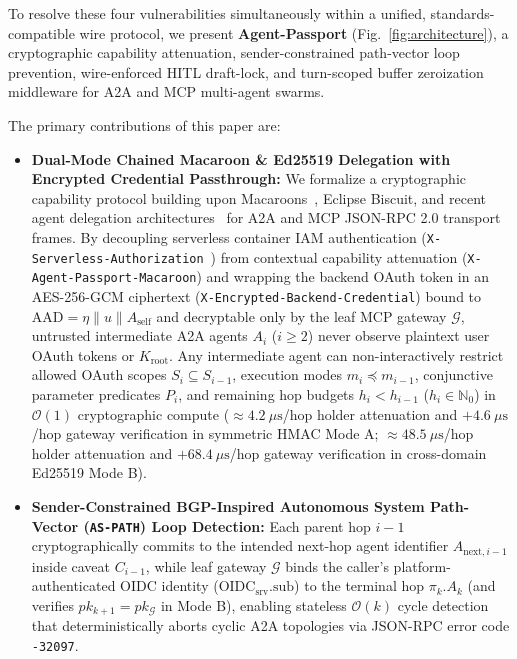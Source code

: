 \documentclass[conference,10pt]{IEEEtran}
\begin{document}
To resolve these four vulnerabilities simultaneously within a unified, standards-compatible wire protocol, we present \textbf{Agent-Passport} (Fig.~\ref{fig:architecture}), a cryptographic capability attenuation, sender-constrained path-vector loop prevention, wire-enforced HITL draft-lock, and turn-scoped buffer zeroization middleware for A2A and MCP multi-agent swarms.

The primary contributions of this paper are:
\begin{itemize}
    \item \textbf{Dual-Mode Chained Macaroon \& Ed25519 Delegation with Encrypted Credential Passthrough:} We formalize a cryptographic capability protocol building upon Macaroons~\cite{birgisson2014macaroons}, Eclipse Biscuit, and recent agent delegation architectures~\cite{prakash2026aip, niyikiza2026aat, tomasev2026delegation} for A2A and MCP JSON-RPC 2.0 transport frames. By decoupling serverless container IAM authentication (\texttt{X-Serverless-Authorization}~\cite{tsao2023cloudrun, salowey2026wimse}) from contextual capability attenuation (\texttt{X-Agent-Passport-Macaroon}) and wrapping the backend OAuth token in an AES-256-GCM ciphertext (\texttt{X-Encrypted-Backend-Credential}) bound to $\text{AAD} = \eta \parallel u \parallel A_{\text{self}}$ and decryptable only by the leaf MCP gateway $\mathcal{G}$, untrusted intermediate A2A agents $A_i$ ($i \ge 2$) never observe plaintext user OAuth tokens or $K_{\text{root}}$. Any intermediate agent can non-interactively restrict allowed OAuth scopes $S_i \subseteq S_{i-1}$, execution modes $m_i \preceq m_{i-1}$, conjunctive parameter predicates $P_i$, and remaining hop budgets $h_i < h_{i-1}$ ($h_i \in \mathbb{N}_0$) in $\mathcal{O}(1)$ cryptographic compute ($\approx 4.2~\mu\text{s}$/hop holder attenuation and $+4.6~\mu\text{s}$/hop gateway verification in symmetric HMAC Mode A; $\approx 48.5~\mu\text{s}$/hop holder attenuation and $+68.4~\mu\text{s}$/hop gateway verification in cross-domain Ed25519 Mode B).
    \item \textbf{Sender-Constrained BGP-Inspired Autonomous System Path-Vector (\texttt{AS-PATH}) Loop Detection:} Each parent hop $i-1$ cryptographically commits to the intended next-hop agent identifier $A_{\text{next},i-1}$ inside caveat $C_{i-1}$, while leaf gateway $\mathcal{G}$ binds the caller's platform-authenticated OIDC identity ($\text{OIDC}_{\text{srv}}.\text{sub}$) to the terminal hop $\pi_k.A_k$ (and verifies $pk_{k+1} = pk_{\mathcal{G}}$ in Mode B), enabling stateless $\mathcal{O}(k)$ cycle detection that deterministically aborts cyclic A2A topologies via JSON-RPC error code \texttt{-32097}.

\end{itemize}
\end{document}
